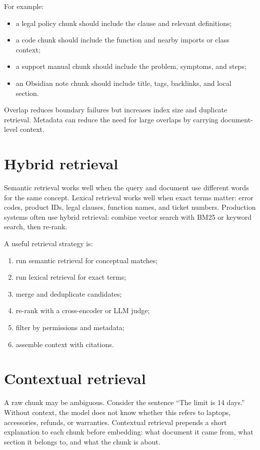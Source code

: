 For example:

\begin{itemize}[leftmargin=*]
  \item a legal policy chunk should include the clause and relevant definitions;
  \item a code chunk should include the function and nearby imports or class context;
  \item a support manual chunk should include the problem, symptoms, and steps;
  \item an Obsidian note chunk should include title, tags, backlinks, and local section.
\end{itemize}

Overlap reduces boundary failures but increases index size and duplicate retrieval. Metadata can reduce the need for large overlaps by carrying document-level context.

\section{Hybrid retrieval}

Semantic retrieval works well when the query and document use different words for the same concept. Lexical retrieval works well when exact terms matter: error codes, product IDs, legal clauses, function names, and ticket numbers. Production systems often use hybrid retrieval: combine vector search with BM25 or keyword search, then re-rank.

A useful retrieval strategy is:

\begin{enumerate}[leftmargin=*]
  \item run semantic retrieval for conceptual matches;
  \item run lexical retrieval for exact terms;
  \item merge and deduplicate candidates;
  \item re-rank with a cross-encoder or LLM judge;
  \item filter by permissions and metadata;
  \item assemble context with citations.
\end{enumerate}

\section{Contextual retrieval}

A raw chunk may be ambiguous. Consider the sentence ``The limit is 14 days.'' Without context, the model does not know whether this refers to laptops, accessories, refunds, or warranties. Contextual retrieval prepends a short explanation to each chunk before embedding: what document it came from, what section it belongs to, and what the chunk is about.

